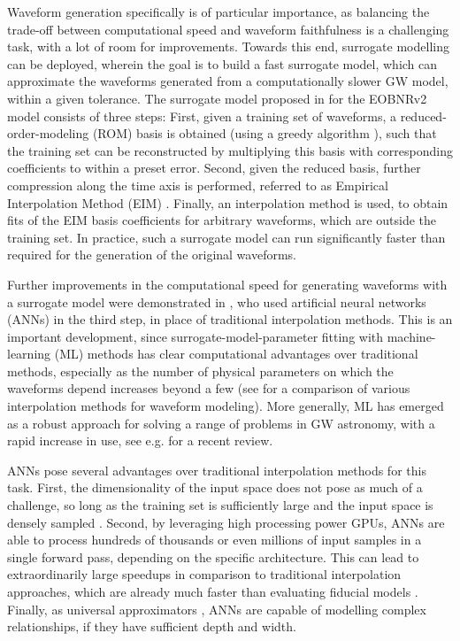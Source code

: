 \documentclass[preprint,12pt]{elsarticle}
\begin{document}
Waveform generation specifically is of particular importance, as balancing the trade-off between computational speed and waveform faithfulness is a challenging task, with a lot of room for improvements. Towards this end, surrogate modelling \cite{field2014fast} can be deployed, wherein the goal is to build a fast surrogate model, which can approximate the waveforms generated from a computationally slower GW model, within a given tolerance. 
The surrogate model proposed in \cite{field2014fast} for the EOBNRv2 model  consists of three steps: First, given a training set of waveforms, a reduced-order-modeling (ROM) basis is obtained (using a greedy algorithm \cite{clrsalgorithms}), such that the training set can be reconstructed by multiplying this basis with corresponding coefficients to within a preset error. Second, given the reduced basis, further compression along the time axis is performed, referred to as Empirical Interpolation Method (EIM)  \cite{barrault2004eim,maday2009eim}. Finally, an interpolation method is used, to obtain fits of the EIM basis coefficients for arbitrary waveforms, which are outside the training set. In practice, such a surrogate model can run significantly faster than required for the generation of the original waveforms.

Further improvements in the computational speed for generating waveforms with a surrogate model were demonstrated in \cite{khan2021gravitational}, who used artificial neural networks (ANNs) in the third step, in place of traditional interpolation methods. This is an important development, since  surrogate-model-parameter fitting with machine-learning (ML) methods has clear computational advantages over traditional methods, especially as the number of physical parameters on which the waveforms depend increases beyond a few (see \cite{setyawati2020regression} for a comparison of various interpolation methods for waveform modeling). More generally, ML has emerged as a robust approach for solving a range of problems in GW astronomy, with a rapid increase in use, see e.g. \cite{cuoco2020review} for a recent review. 

ANNs pose several advantages over traditional interpolation methods for this task. First, the dimensionality of the input space does not pose as much of a challenge, so long as the training set is sufficiently large and the input space is densely sampled \cite{khan2021gravitational}. Second, by leveraging high processing power GPUs, ANNs are able to process hundreds of thousands or even millions of input samples in a single forward pass, depending on the specific architecture. This can lead to extraordinarily large speedups in comparison to traditional interpolation approaches, which are already much faster than evaluating fiducial models \cite{field2014fast}. Finally, as universal approximators \cite{sonoda2017neural}, ANNs are capable of modelling complex relationships, if they have sufficient depth and width.
\end{document}
